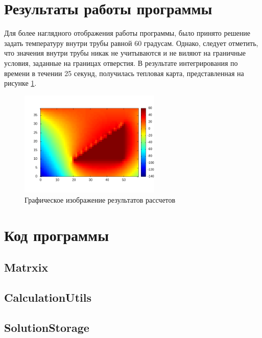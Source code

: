 \documentclass[12pt, a4paper]{article}
\begin{document}
	\section{Результаты работы программы}
	
	Для более наглядного отображения работы программы, было принято решение задать температуру внутри трубы равной 60 градусам. Однако, следует отметить, что значения внутри трубы никак не учитываются и не виляют на граничные условия, заданные на границах отверстия. В результате интегрирования по времени в течении 25 секунд, получилась тепловая карта, представленная на рисунке \ref{fig:pic2}.
	
	\begin{figure}[h]
		\centering    %
		\includegraphics[width=0.6\textwidth]{static/heatmap.png}
		\caption{Графическое изображение результатов рассчетов} %
		\label{fig:pic2} %
	\end{figure}
	
	\section{Код программы}
	
	\subsection{Matrxix}
	
	
	\subsection{CalculationUtils}
	
	
	\subsection{SolutionStorage}
	
	
\end{document}
